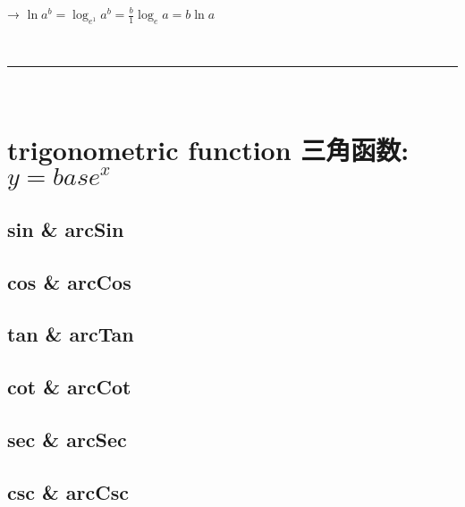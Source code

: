 \documentclass[UTF8]{ctexart}
\begin{document}
→ $\ln a^b=\log _{e^1}a^b=\frac{b}{1}\log _ea=b\ln a $



~\\
\hrule
~\\


\section{trigonometric function 三角函数:  $ y=base^x $}

\subsection{sin \& arcSin}





\subsection{cos \& arcCos}



\subsection{tan \& arcTan}




\subsection{cot \& arcCot}




\subsection{sec \& arcSec}




\subsection{csc \& arcCsc}
\end{document}

